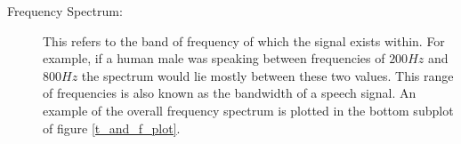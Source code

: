 \begin{description}
\item[Frequency Spectrum:]
This refers to the band of frequency of which the signal exists within. For example, if a human male was speaking between frequencies of $200Hz$ and $800Hz$ the spectrum would lie mostly between these two values. This range of frequencies is also known as the bandwidth of a speech signal. An example of the overall frequency spectrum is plotted in the bottom subplot of figure \ref{t_and_f_plot}.



\end{description}



